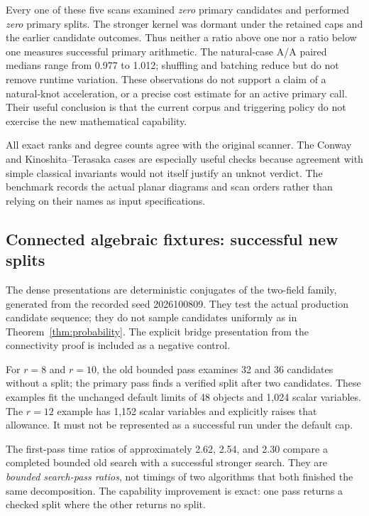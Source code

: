 \documentclass[11pt,a4paper]{article}
\theoremstyle{definition}\newtheorem{definition}[theorem]{Definition}
\theoremstyle{remark}\newtheorem{remark}[theorem]{Remark}
\begin{document}
Every one of these five scans examined \emph{zero} primary candidates and
performed \emph{zero} primary splits. The stronger kernel was dormant
under the retained caps and the earlier candidate outcomes. Thus neither a
ratio above one nor a ratio below one measures successful primary
arithmetic. The natural-case A/A paired medians range from 0.977 to 1.012;
shuffling and batching reduce but do not remove runtime variation. These
observations do not support a claim of a natural-knot acceleration, or a
precise cost estimate for an active primary call. Their useful conclusion
is that the current corpus and triggering policy do not exercise the new
mathematical capability.

All exact ranks and degree counts agree with the original scanner. The
Conway and Kinoshita--Terasaka cases are especially useful checks because
agreement with simple classical invariants would not itself justify an
unknot verdict. The benchmark records the actual planar diagrams and scan
orders rather than relying on their names as input specifications.

\subsection{Connected algebraic fixtures: successful new splits}



The dense presentations are deterministic conjugates of the two-field
family, generated from the recorded seed 2026100809. They test the actual
production candidate sequence; they do not sample candidates uniformly as
in Theorem~\ref{thm:probability}. The explicit bridge presentation from the
connectivity proof is included as a negative control.

For $r=8$ and $r=10$, the old bounded pass examines 32 and 36 candidates
without a split; the primary pass finds a verified split after two
candidates. These examples fit the unchanged default limits of 48 objects
and 1,024 scalar variables. The $r=12$ example has 1,152 scalar variables
and explicitly raises that allowance. It must not be represented as a
successful run under the default cap.

The first-pass time ratios of approximately 2.62, 2.54, and 2.30 compare a
completed bounded old search with a successful stronger search. They are
\emph{bounded search-pass ratios}, not timings of two algorithms that both
finished the same decomposition. The capability improvement is exact:
one pass returns a checked split where the other returns no split.
\end{document}
